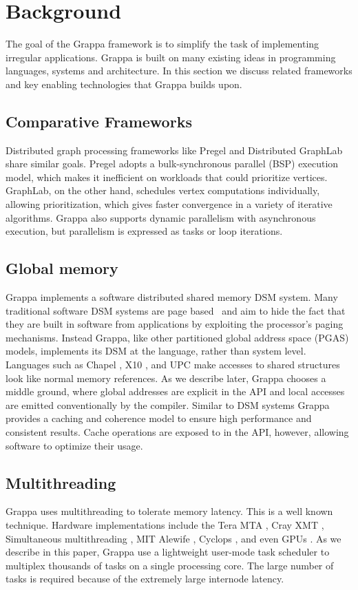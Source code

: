 \section{Background}

The goal of the Grappa framework is to simplify the task of implementing irregular applications.  Grappa is built on many existing ideas in programming languages, systems and architecture.  In this section we discuss related frameworks and key enabling technologies that Grappa builds upon.

\subsection{Comparative Frameworks}

Distributed graph processing frameworks like Pregel \cite{pregel:2010} and Distributed GraphLab \cite{distgraphlab:vldb12} share similar goals.  Pregel adopts a bulk-synchronous parallel (BSP) execution model, which makes it inefficient on workloads that could prioritize vertices. GraphLab, on the other hand, schedules vertex computations individually, allowing prioritization, which gives faster convergence in a variety of iterative algorithms. Grappa also supports dynamic parallelism with asynchronous execution, but parallelism is expressed as tasks or loop iterations.

\subsection{Global memory}

Grappa implements a software distributed shared memory DSM system.  Many traditional software DSM systems are page based~\cite{Treadmarks} and aim to hide the fact that they are built in software from applications by exploiting the processor's paging mechanisms.  Instead Grappa, like other partitioned global address space (PGAS) models, implements its DSM at the language, rather than system level.  Languages such as Chapel \cite{Chapel}, X10 \cite{X10}, and UPC \cite{UPC} make accesses to shared structures look like normal memory references.  As we describe later, Grappa chooses a middle ground, where global addresses are explicit in the API and local accesses are emitted conventionally by the compiler.  Similar to DSM systems Grappa provides a caching and coherence model to ensure high performance and consistent results.  Cache operations are exposed to in the API, however, allowing software to optimize their usage.

\subsection{Multithreading}

Grappa uses multithreading to tolerate memory latency.  This is a well known technique.  Hardware implementations include the Tera MTA \cite{Tera}, Cray XMT \cite{XMT}, Simultaneous multithreading \cite{SMT}, MIT Alewife \cite{Alewife}, Cyclops \cite{Cyclops}, and even GPUs \cite{fatahalian}.  As we describe in this paper, Grappa use a lightweight user-mode task scheduler to multiplex thousands of tasks on a single processing core.  The large number of tasks is required because of the extremely large internode latency.
